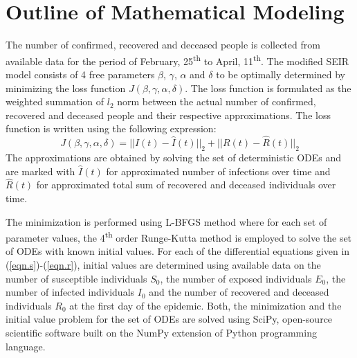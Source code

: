 \documentclass[conference]{IEEEtran}
\begin{document}
\appendices
\renewcommand{\theequation}{\thesection.\arabic{equation}}
\setcounter{equation}{0}

\section{Outline of Mathematical Modeling}
\label{sec.mathdetails}
The number of confirmed, recovered and deceased people is collected from available data for the period of February, 25\textsuperscript{th} to April, 11\textsuperscript{th}. The modified SEIR model consists of 4 free parameters $\beta$, $\gamma$, $\alpha$ and $\delta$ to be optimally determined by minimizing the loss function $J(\beta, \gamma, \alpha, \delta)$. The loss function is formulated as the weighted summation of $l_2$ norm between the actual number of confirmed, recovered and deceased people and their respective approximations. The loss function is written using the following expression:
\begin{equation}
    J(\beta, \gamma, \alpha, \delta) = \lvert\lvert I(t) - \hat{I}(t)\lvert\lvert_2 + \lvert\lvert R(t) - \hat{R}(t)\lvert\lvert_2
\end{equation}
The approximations are obtained by solving the set of deterministic ODEs and are marked with $\hat{I}(t)$ for approximated number of infections over time and $\hat{R}(t)$ for approximated total sum of recovered and deceased individuals over time. 

The minimization is performed using L-BFGS method where for each set of parameter values, the 4\textsuperscript{th} order Runge-Kutta method is employed to solve the set of ODEs with known initial values. For each of the differential equations given in (\ref{eqn.s})-(\ref{eqn.r}), initial values are determined using available data on the number of susceptible individuals $S_0$, the number of exposed individuals $E_0$, the number of infected individuals $I_0$ and the number of recovered and deceased individuals $R_0$ at the first day of the epidemic. Both, the minimization and the initial value problem for the set of ODEs are solved using SciPy, open-source scientific software built on the NumPy extension of Python programming language.

\setcounter{equation}{0}
\end{document}
